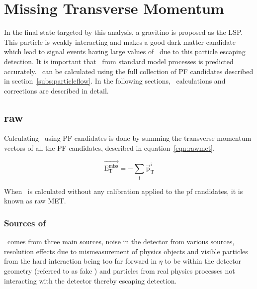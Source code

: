 \chapter{Missing Transverse Momentum}
\label{ch:MET}
In the final state targeted by this analysis, a gravitino is proposed as the LSP.
This particle is weakly interacting and makes a good dark matter candidate
which lead to signal events having large values of \MET\ due to this particle escaping detection.
It is important that \MET\ from standard model processes is predicted accurately.
\MET\ can be calculated using the full collection of PF candidates described in section~\ref{subs:particleflow}.
In the following sections, \MET\ calculations and corrections are described in detail.

\section{raw \texorpdfstring{\MET}{MET}}

Calculating \MET\ using PF candidates is done by summing the transverse momentum vectors of all the PF candidates, described in equation~\ref{eqn:rawmet}.

\begin{equation}
  \label{eqn:rawmet}
\mathrm{\overrightarrow{E_{T}^{miss}} = -\sum_{i}\overrightarrow{p}_{T}^{i}}
\end{equation}

When \MET\ is calculated without any calibration applied to the pf candidates, it is known as raw MET.

\subsection{Sources of \texorpdfstring{\MET}{MET}}
\label{sec:metsources}
\MET\ comes from three main sources,
noise in the detector from various sources,
resolution effects due to mismeasurement of physics objects and
visible particles from the hard interaction being too far forward in $\eta$ to be within the detector geometry (referred to as fake \MET)
and particles from real physics processes not interacting with the detector thereby escaping detection.

